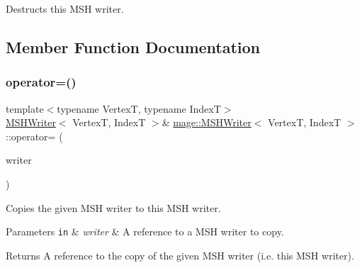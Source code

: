 Destructs this M\+SH writer. 

\subsection{Member Function Documentation}
\hypertarget{classmage_1_1_m_s_h_writer_a2c44587daf98ba5565ac883878b61c9e}{}\label{classmage_1_1_m_s_h_writer_a2c44587daf98ba5565ac883878b61c9e} 
\subsubsection{\texorpdfstring{operator=()}{operator=()}\hspace{0.1cm}{\footnotesize\ttfamily [1/2]}}
{\footnotesize\ttfamily template$<$typename VertexT, typename IndexT$>$ \\
\hyperlink{classmage_1_1_m_s_h_writer}{M\+S\+H\+Writer}$<$ VertexT, IndexT $>$\& \hyperlink{classmage_1_1_m_s_h_writer}{mage\+::\+M\+S\+H\+Writer}$<$ VertexT, IndexT $>$\+::operator= (\begin{DoxyParamCaption}\item[{const \hyperlink{classmage_1_1_m_s_h_writer}{M\+S\+H\+Writer}$<$ VertexT, IndexT $>$ \&}]{writer }\end{DoxyParamCaption})\hspace{0.3cm}{\ttfamily [delete]}}

Copies the given M\+SH writer to this M\+SH writer.


\begin{DoxyParams}[1]{Parameters}
\mbox{\tt in}  & {\em writer} & A reference to a M\+SH writer to copy. \\
\hline
\end{DoxyParams}
\begin{DoxyReturn}{Returns}
A reference to the copy of the given M\+SH writer (i.\+e. this M\+SH writer). 
\end{DoxyReturn}
\hypertarget{classmage_1_1_m_s_h_writer_ae1fddfee32bfcf1e6b9f031749cdbbcb}{}\label{classmage_1_1_m_s_h_writer_ae1fddfee32bfcf1e6b9f031749cdbbcb} 
